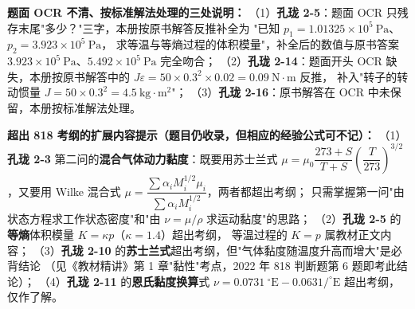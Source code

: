 \begin{tishi}
\textbf{题面 OCR 不清、按标准解法处理的三处说明：}
（1）\textbf{孔珑 2-5}：题面 OCR 只残存末尾"多少？"三字，本册按原书解答反推补全为
"已知 $p_1=1.01325\times10^{5}\ \mathrm{Pa}$、$p_2=3.923\times10^{5}\ \mathrm{Pa}$，
求等温与等熵过程的体积模量"，补全后的数值与原书答案
$3.923\times10^{5}\ \mathrm{Pa}$、$5.492\times10^{5}\ \mathrm{Pa}$ 完全吻合；
（2）\textbf{孔珑 2-14}：题面开头 OCR 缺失，本册按原书解答中的
$J\varepsilon=50\times0.3^{2}\times0.02=0.09\ \mathrm{N\cdot m}$ 反推，
补入"转子的转动惯量 $J=50\times0.3^{2}=4.5\ \mathrm{kg\cdot m^2}$"；
（3）\textbf{孔珑 2-16}：原书解答在 OCR 中未保留，本册按标准解法处理。
\end{tishi}

\begin{tishi}
\textbf{超出 818 考纲的扩展内容提示（题目仍收录，但相应的经验公式可不记）：}
（1）\textbf{孔珑 2-3} 第二问的\textbf{混合气体动力黏度}：既要用苏士兰式
$\mu=\mu_0\dfrac{273+S}{T+S}\left(\dfrac{T}{273}\right)^{3/2}$，又要用 Wilke 混合式
$\mu=\dfrac{\sum\alpha_i M_i^{1/2}\mu_i}{\sum\alpha_i M_i^{1/2}}$，两者都超出考纲；
只需掌握第一问"由状态方程求工作状态密度"和"由 $\nu=\mu/\rho$ 求运动黏度"的思路；
（2）\textbf{孔珑 2-5} 的\textbf{等熵}体积模量 $K=\kappa p$（$\kappa=1.4$）超出考纲，
等温过程的 $K=p$ 属教材正文内容；
（3）\textbf{孔珑 2-10} 的\textbf{苏士兰式}超出考纲，但"气体黏度随温度升高而增大"是必背结论
（见《教材精讲》第 1 章"黏性"考点，2022 年 818 判断题第 6 题即考此结论）；
（4）\textbf{孔珑 2-11} 的\textbf{恩氏黏度换算}式
$\nu=0.0731\ ^{\circ}\mathrm{E}-0.0631/^{\circ}\mathrm{E}$ 超出考纲，仅作了解。
\end{tishi}
